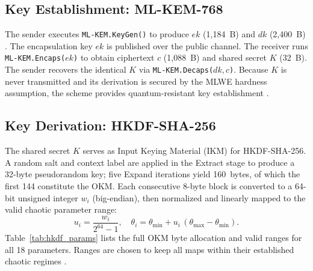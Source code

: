 \documentclass[conference]{IEEEtran}
\begin{document}
\subsection{Key Establishment: ML-KEM-768}

The sender executes \texttt{ML-KEM.KeyGen()} to produce $\mathit{ek}$ (1,184~B) and $\mathit{dk}$ (2,400~B) \cite{b5}. The encapsulation key $\mathit{ek}$ is published over the public channel. The receiver runs \texttt{ML-KEM.Encaps($\mathit{ek}$)} to obtain ciphertext $c$ (1,088~B) and shared secret $K$ (32~B). The sender recovers the identical $K$ via \texttt{ML-KEM.Decaps($\mathit{dk}, c$)}. Because $K$ is never transmitted and its derivation is secured by the MLWE hardness assumption, the scheme provides quantum-resistant key establishment \cite{b6}.

\subsection{Key Derivation: HKDF-SHA-256}

The shared secret $K$ serves as Input Keying Material (IKM) for HKDF-SHA-256. A random salt and context label are applied in the Extract stage to produce a 32-byte pseudorandom key; five Expand iterations yield 160~bytes, of which the first 144 constitute the OKM. Each consecutive 8-byte block is converted to a 64-bit unsigned integer $w_i$ (big-endian), then normalized and linearly mapped to the valid chaotic parameter range:
\begin{equation}
	u_i = \frac{w_i}{2^{64}-1},\quad \theta_i = \theta_{\min} + u_i\,(\theta_{\max}-\theta_{\min}).
	\label{eq:parammap}
\end{equation}
Table~\ref{tab:hkdf_params} lists the full OKM byte allocation and valid ranges for all 18 parameters. Ranges are chosen to keep all maps within their established chaotic regimes \cite{b25,b28}.
\end{document}
